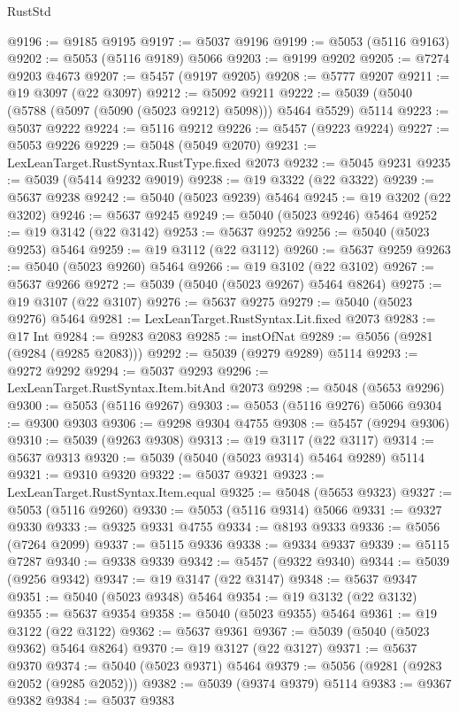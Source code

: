 \begin{lexlean}{RustStd}
\begin{coremodule}
@9196 := @9185 @9195
@9197 := @5037 @9196
@9199 := @5053 (@5116 @9163)
@9202 := @5053 (@5116 @9189) @5066
@9203 := @9199 @9202
@9205 := @7274 @9203 @4673
@9207 := @5457 (@9197 @9205)
@9208 := @5777 @9207
@9211 := @19 @3097 (@22 @3097)
@9212 := @5092 @9211
@9222 := @5039 (@5040 (@5788 (@5097 (@5090 (@5023 @9212) @5098))) @5464 @5529) @5114
@9223 := @5037 @9222
@9224 := @5116 @9212
@9226 := @5457 (@9223 @9224)
@9227 := @5053 @9226
@9229 := @5048 (@5049 @2070)
@9231 := LexLeanTarget.RustSyntax.RustType.fixed @2073
@9232 := @5045 @9231
@9235 := @5039 (@5414 @9232 @9019)
@9238 := @19 @3322 (@22 @3322)
@9239 := @5637 @9238
@9242 := @5040 (@5023 @9239) @5464
@9245 := @19 @3202 (@22 @3202)
@9246 := @5637 @9245
@9249 := @5040 (@5023 @9246) @5464
@9252 := @19 @3142 (@22 @3142)
@9253 := @5637 @9252
@9256 := @5040 (@5023 @9253) @5464
@9259 := @19 @3112 (@22 @3112)
@9260 := @5637 @9259
@9263 := @5040 (@5023 @9260) @5464
@9266 := @19 @3102 (@22 @3102)
@9267 := @5637 @9266
@9272 := @5039 (@5040 (@5023 @9267) @5464 @8264)
@9275 := @19 @3107 (@22 @3107)
@9276 := @5637 @9275
@9279 := @5040 (@5023 @9276) @5464
@9281 := LexLeanTarget.RustSyntax.Lit.fixed @2073
@9283 := @17 Int
@9284 := @9283 @2083
@9285 := instOfNat
@9289 := @5056 (@9281 (@9284 (@9285 @2083)))
@9292 := @5039 (@9279 @9289) @5114
@9293 := @9272 @9292
@9294 := @5037 @9293
@9296 := LexLeanTarget.RustSyntax.Item.bitAnd @2073
@9298 := @5048 (@5653 @9296)
@9300 := @5053 (@5116 @9267)
@9303 := @5053 (@5116 @9276) @5066
@9304 := @9300 @9303
@9306 := @9298 @9304 @4755
@9308 := @5457 (@9294 @9306)
@9310 := @5039 (@9263 @9308)
@9313 := @19 @3117 (@22 @3117)
@9314 := @5637 @9313
@9320 := @5039 (@5040 (@5023 @9314) @5464 @9289) @5114
@9321 := @9310 @9320
@9322 := @5037 @9321
@9323 := LexLeanTarget.RustSyntax.Item.equal
@9325 := @5048 (@5653 @9323)
@9327 := @5053 (@5116 @9260)
@9330 := @5053 (@5116 @9314) @5066
@9331 := @9327 @9330
@9333 := @9325 @9331 @4755
@9334 := @8193 @9333
@9336 := @5056 (@7264 @2099)
@9337 := @5115 @9336
@9338 := @9334 @9337
@9339 := @5115 @7287
@9340 := @9338 @9339
@9342 := @5457 (@9322 @9340)
@9344 := @5039 (@9256 @9342)
@9347 := @19 @3147 (@22 @3147)
@9348 := @5637 @9347
@9351 := @5040 (@5023 @9348) @5464
@9354 := @19 @3132 (@22 @3132)
@9355 := @5637 @9354
@9358 := @5040 (@5023 @9355) @5464
@9361 := @19 @3122 (@22 @3122)
@9362 := @5637 @9361
@9367 := @5039 (@5040 (@5023 @9362) @5464 @8264)
@9370 := @19 @3127 (@22 @3127)
@9371 := @5637 @9370
@9374 := @5040 (@5023 @9371) @5464
@9379 := @5056 (@9281 (@9283 @2052 (@9285 @2052)))
@9382 := @5039 (@9374 @9379) @5114
@9383 := @9367 @9382
@9384 := @5037 @9383

\end{coremodule}
\end{lexlean}
